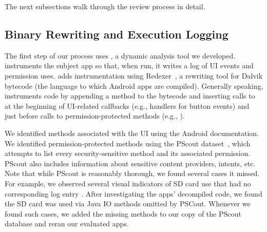 The next subsections walk through the review process in detail.


\subsection{Binary Rewriting and Execution Logging}

The first step of our process uses \apptracer{}, a dynamic analysis tool
we developed. \apptracer{}
instruments the subject app so that, when run, it writes
a log of UI events and permission uses. \apptracer{} adds
instrumentation using Redexer~\cite{jsjeon:spsm12}, a
rewriting tool for Dalvik bytecode (the language
to which Android apps are compiled). Generally speaking, \apptracer{}
instruments code by appending a  method to the bytecode and
inserting calls to  at the beginning of UI-related callbacks
(e.g.,  handlers for button events) and just before
calls to permission-protected methods (e.g., ).

We identified methods associated with the UI using the Android
documentation. We identified permission-protected methods using the 
PScout dataset~\cite{Au:2012}, which attempts to list every
security-sensitive method and its associated permission. PScout also
includes information about sensitive content providers, intents, etc.
%
Note that while PScout is reasonably thorough, we found several cases
it missed. For example, we observed several visual
indicators of SD card use that had no corresponding log entry
\apptracer{}.  After
investigating the apps' decompiled code, we found the SD card was used
via Java IO methods omitted by PSCout. Whenever we found
such cases, we added the missing methods to our copy of the PScout
database and reran our evaluated apps.


